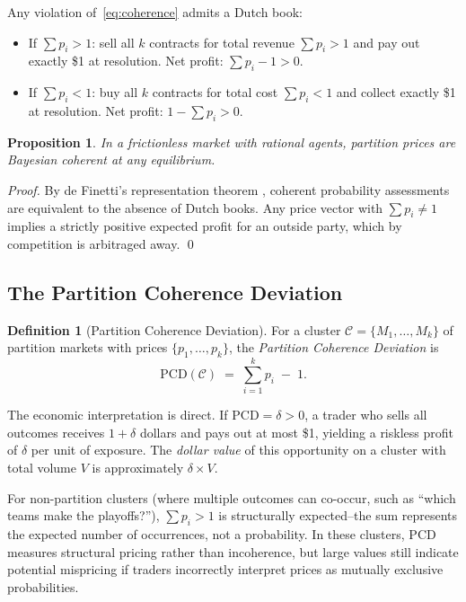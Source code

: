\documentclass[12pt,a4paper]{article}
\newtheorem{proposition}[theorem]{Proposition}
\theoremstyle{definition}
\newtheorem{definition}[theorem]{Definition}
\theoremstyle{remark}
\newcommand{\PCD}{\mathrm{PCD}}
\begin{document}
Any violation of~\eqref{eq:coherence} admits a Dutch book:
\begin{itemize}
  \item If $\sum p_i > 1$: sell all $k$ contracts for total revenue $\sum p_i > 1$
    and pay out exactly \$1 at resolution. Net profit: $\sum p_i - 1 > 0$.
  \item If $\sum p_i < 1$: buy all $k$ contracts for total cost $\sum p_i < 1$
    and collect exactly \$1 at resolution. Net profit: $1 - \sum p_i > 0$.
\end{itemize}

\begin{proposition}
\label{prop:dutch_book}
In a frictionless market with rational agents, partition prices are Bayesian
coherent at any equilibrium.
\end{proposition}

\begin{proof}
By de Finetti's representation theorem \citep{deFinetti1937}, coherent
probability assessments are equivalent to the absence of Dutch books.
Any price vector with $\sum p_i \neq 1$ implies a strictly positive expected
profit for an outside party, which by competition is arbitraged away. \qed
\end{proof}

\subsection{The Partition Coherence Deviation}

\begin{definition}[Partition Coherence Deviation]
\label{def:pcd}
For a cluster $\mathcal{C} = \{M_1, \ldots, M_k\}$ of partition markets with
prices $\{p_1, \ldots, p_k\}$, the \emph{Partition Coherence Deviation} is
\begin{equation}
  \PCD(\mathcal{C}) \;=\; \sum_{i=1}^{k} p_i \;-\; 1.
  \label{eq:pcd}
\end{equation}
\end{definition}

The economic interpretation is direct.
If $\PCD = \delta > 0$, a trader who sells all outcomes receives $1 + \delta$
dollars and pays out at most \$1, yielding a riskless profit of $\delta$ per
unit of exposure.
The \emph{dollar value} of this opportunity on a cluster with total volume $V$
is approximately $\delta \times V$.

For non-partition clusters (where multiple outcomes can co-occur, such as
``which teams make the playoffs?''), $\sum p_i > 1$ is structurally
expected--the sum represents the expected number of occurrences, not a
probability. In these clusters, $\PCD$ measures structural pricing rather
than incoherence, but large values still indicate potential mispricing
if traders incorrectly interpret prices as mutually exclusive probabilities.
\end{document}
